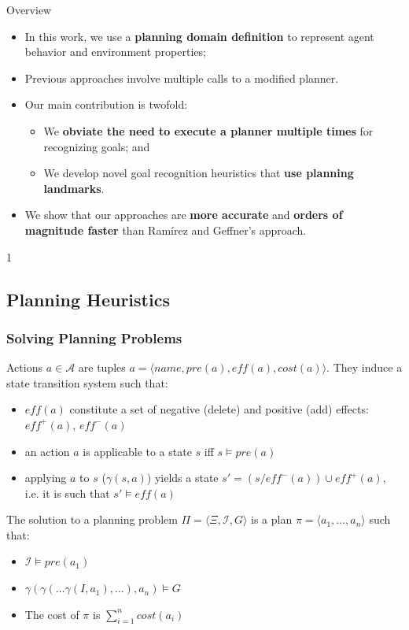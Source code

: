 \documentclass{beamer}
\def\masterclass{1}
\begin{document}
    \begin{frame}{Overview}
       	\begin{itemize}
			\item In this work, we use a \textbf{planning domain definition} to represent agent behavior and environment properties;
			\item Previous approaches involve multiple calls to a modified planner.
			\item Our main contribution is twofold:
				\begin{itemize}
					\item We \textbf{obviate the need to execute a planner multiple times} for recognizing goals; and
					\item We develop novel goal recognition heuristics that \textbf{use planning landmarks}.
				 \end{itemize}
			\item We show that our approaches are \textbf{more accurate} and \textbf{orders of magnitude faster} than Ramírez and Geffner's approach.
		\end{itemize}
    \end{frame}

\if\masterclass1
	

\subsection{Planning Heuristics}
	
	\begin{frame}[c]\frametitle{Solving Planning Problems}
		Actions $a \in \mathcal{A}$ are tuples $a = \langle \mathit{name}, \mathit{pre}(a), \mathit{eff}(a), \mathit{cost}(a) \rangle$.
		They induce a state transition system such that:
		\begin{itemize}
			\item $\mathit{eff}(a)$ constitute a set of negative (delete) and positive (add) effects: $\mathit{eff}^{+}(a)$, $\mathit{eff}^{-}(a)$
			\item an action $a$ is applicable to a state $s$ iff $s \models \mathit{pre}(a)$
			\item applying $a$ to $s$ ($\gamma(s,a)$) yields a state $s' = (s / \mathit{eff}^{-}(a)) \cup  \mathit{eff}^{+}(a)$, \\i.e. it is such that $s' \models \mathit{eff}(a)$
		\end{itemize}
		The solution to a planning problem $\Pi = \langle \Xi, \mathcal{I}, G\rangle$ is a plan $\pi = \langle a_1, \dots, a_n\rangle$ such that:
		\begin{itemize}
			\item $\mathcal{I} \models \mathit{pre}(a_1)$
			\item $\gamma(\gamma(\dots \gamma(I, a_1),\dots), a_n) \models G$
			\item The cost of $\pi$ is $\sum_{i=1}^{n}\mathit{cost}(a_i)$
		\end{itemize}
	\end{frame}
	
\end{document}
